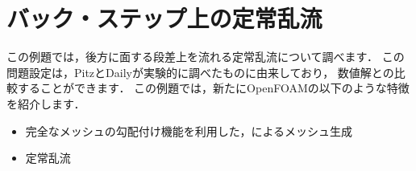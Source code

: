 


\section{バック・ステップ上の定常乱流}
\label{sec:3.2}
この例題では，後方に面する段差上を流れる定常乱流について調べます．
この問題設定は，PitzとDailyが実験的に調べたものに由来しており，
数値解との比較することができます．
この例題では，新たにOpenFOAMの以下のような特徴を紹介します．
\begin{itemize}
 \item 完全なメッシュの勾配付け機能を利用した，によるメッシュ生成
 \item 定常乱流
\end{itemize}


